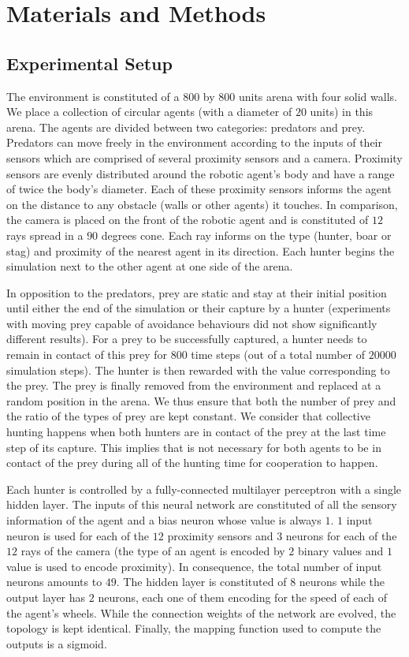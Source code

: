 \section{Materials and Methods}
\label{sec:matandmet}
  \subsection*{Experimental Setup}
    The environment is constituted of a $800$ by $800$ units arena with four solid walls. We place a collection of circular agents (with a diameter of $20$ units) in this arena. The agents are divided between two categories: predators and prey. Predators can move freely in the environment according to the inputs of their sensors which are comprised of several proximity sensors and a camera. Proximity sensors are evenly distributed around the robotic agent's body and have a range of twice the body's diameter. Each of these proximity sensors informs the agent on the distance to any obstacle (walls or other agents) it touches. In comparison, the camera is placed on the front of the robotic agent and is constituted of $12$ rays spread in a $90$ degrees cone. Each ray informs on the type (hunter, boar or stag) and proximity of the nearest agent in its direction. Each hunter begins the simulation next to the other agent at one side of the arena.

    In opposition to the predators, prey are static and stay at their initial position until either the end of the simulation or their capture by a hunter (experiments with moving prey capable of avoidance behaviours did not show significantly different results). For a prey to be successfully captured, a hunter needs to remain in contact of this prey for $800$ time steps (out of a total number of $20000$ simulation steps). The hunter is then rewarded with the value corresponding to the prey. The prey is finally removed from the environment and replaced at a random position in the arena. We thus ensure that both the number of prey and the ratio of the types of prey are kept constant. We consider that collective hunting happens when both hunters are in contact of the prey at the last time step of its capture. This implies that is not necessary for both agents to be in contact of the prey during all of the hunting time for cooperation to happen.

    Each hunter is controlled by a fully-connected multilayer perceptron with a single hidden layer. The inputs of this neural network are constituted of all the sensory information of the agent and a bias neuron whose value is always $1$. $1$ input neuron is used for each of the $12$ proximity sensors and $3$ neurons for each of the $12$ rays of the camera (the type of an agent is encoded by $2$ binary values and $1$ value is used to encode proximity). In consequence, the total number of input neurons amounts to $49$. The hidden layer is constituted of $8$ neurons while the output layer has $2$ neurons, each one of them encoding for the speed of each of the agent's wheels. While the connection weights of the network are evolved, the topology is kept identical. Finally, the mapping function used to compute the outputs is a sigmoid.


